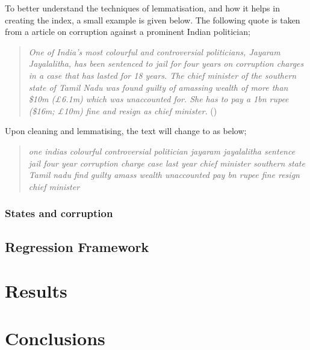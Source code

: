 \documentclass[twoside]{article}
\begin{document}
To better understand the techniques of lemmatisation, and how it helps
in creating the index, a small example is given below. The following
quote is taken from a article on corruption against a prominent Indian
politician;

\begin{quote}
\emph{One of India's most colourful and controversial politicians,
Jayaram Jayalalitha, has been sentenced to jail for four years on
corruption charges in a case that has lasted for 18 years. The chief
minister of the southern state of Tamil Nadu was found guilty of
amassing wealth of more than \$10m (£6.1m) which was unaccounted for.
She has to pay a 1bn rupee (\$16m; £10m) fine and resign as chief
minister.} (\citet{bbc2014})
\end{quote}

Upon cleaning and lemmatising, the text will change to as below;

\begin{quote}
\emph{one indias colourful controversial politician jayaram jayalalitha
sentence jail four year corruption charge case last year chief minister
southern state Tamil nadu find guilty amass wealth unaccounted pay bn
rupee fine resign chief minister}
\end{quote}

\subsubsection{States and corruption}\label{states-and-corruption}

\subsection{Regression Framework}\label{regression-framework}

\section{Results}\label{results}

\section{Conclusions}\label{conclusions}

\renewcommand\refname{References}

\end{document}
